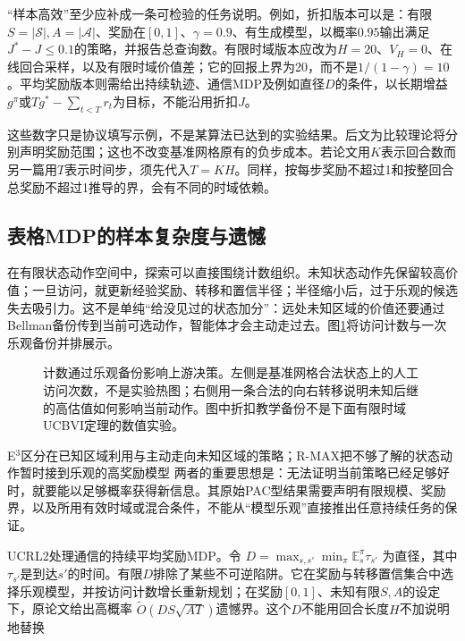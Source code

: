 “样本高效”至少应补成一条可检验的任务说明。例如，折扣版本可以是：有限$S=|\mathcal S|,A=|\mathcal A|$、奖励在$[0,1]$、$\gamma=0.9$、有生成模型，以概率$0.95$输出满足$J^*-J\leq0.1$的策略，并报告总查询数。有限时域版本应改为$H=20$、$V_H=0$、在线回合采样，以及有限时域价值差；它的回报上界为20，而不是$1/(1-\gamma)=10$。平均奖励版本则需给出持续轨迹、通信MDP及例如直径$D$的条件，以长期增益$g^\pi$或$Tg^*-\sum_{t<T}r_t$为目标，不能沿用折扣$J$。

这些数字只是协议填写示例，不是某算法已达到的实验结果。后文为比较理论将分别声明奖励范围；这也不改变基准网格原有的负步成本。若论文用$K$表示回合数而另一篇用$T$表示时间步，须先代入$T=KH$。同样，按每步奖励不超过1和按整回合总奖励不超过1推导的界，会有不同的时域依赖。

\subsection{表格MDP的样本复杂度与遗憾}
\label{sec:rl-learning-tabular-complexity}

在有限状态动作空间中，探索可以直接围绕计数组织。未知状态动作先保留较高价值；一旦访问，就更新经验奖励、转移和置信半径；半径缩小后，过于乐观的候选失去吸引力。这不是单纯“给没见过的状态加分”：远处未知区域的价值还要通过Bellman备份传到当前可选动作，智能体才会主动走过去。图\ref{fig:rl-learning-optimistic-grid}将访问计数与一次乐观备份并排展示。

\begin{figure}[t]
  \centering
  
  \caption{计数通过乐观备份影响上游决策。左侧是基准网格合法状态上的人工访问次数，不是实验热图；右侧用一条合法的向右转移说明未知后继的高估值如何影响当前动作。图中折扣教学备份不是下面有限时域UCBVI定理的数值实验。}
  \label{fig:rl-learning-optimistic-grid}
\end{figure}

E$^3$区分在已知区域利用与主动走向未知区域的策略；R-MAX把不够了解的状态动作暂时接到乐观的高奖励模型
两者的重要思想是：无法证明当前策略已经足够好时，就要能以足够概率获得新信息。其原始PAC型结果需要声明有限规模、奖励界，以及所用有效时域或混合条件，不能从“模型乐观”直接推出任意持续任务的保证。

UCRL2处理通信的持续平均奖励MDP。令
$D=\max_{s,s'}\min_\pi\mathbb E_s^\pi\tau_{s'}$
为直径，其中$\tau_{s'}$是到达$s'$的时间。有限$D$排除了某些不可逆陷阱。它在奖励与转移置信集合中选择乐观模型，并按访问计数增长重新规划；在奖励$[0,1]$、未知有限$S,A$的设定下，原论文给出高概率
$\widetilde O(DS\sqrt{AT})$遗憾界。这个$D$不能用回合长度$H$不加说明地替换

